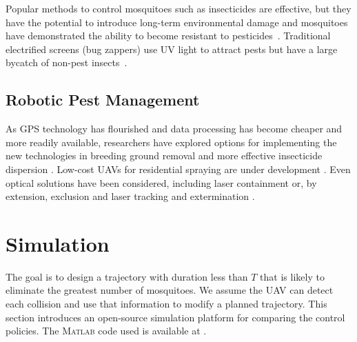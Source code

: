 \documentclass[letterpaper, 10 pt, conference]{ieeeconf}  %
\begin{document}
	Popular methods to control mosquitoes such as insecticides are effective, but they have the potential to introduce long-term environmental damage and mosquitoes have demonstrated the ability to become resistant to pesticides~\cite{ndiath2012resistance}. Traditional electrified screens (bug zappers) use UV light to attract pests but have a large bycatch of non-pest insects~\cite{University-Of-Florida1997}. 
	
 
    \subsection{Robotic Pest Management}
    
As GPS technology has flourished and data processing has become cheaper and more readily available, researchers have explored options for implementing the new technologies in breeding ground removal \cite{anupa2014identification} and more effective insecticide dispersion \cite{hur2015low}.  Low-cost UAVs for residential spraying are under development \cite{amenyo2014medizdroids}.  Even optical solutions have been considered, including laser containment \cite{boonsri2012laser} or, by extension, exclusion and laser tracking and extermination \cite{kare2010build}.
    
   
    \section{Simulation}\label{sec:Simulation}
     The goal is to design a trajectory with duration less than $T$ that is likely to eliminate the greatest number of mosquitoes.  
   We assume the UAV can detect each collision and use that information to modify a planned trajectory. 
  This section introduces an open-source simulation platform for comparing the control policies.  The \textsc{Matlab} code used is available at \cite{Burbage2016matlab}. 
    
\end{document}
